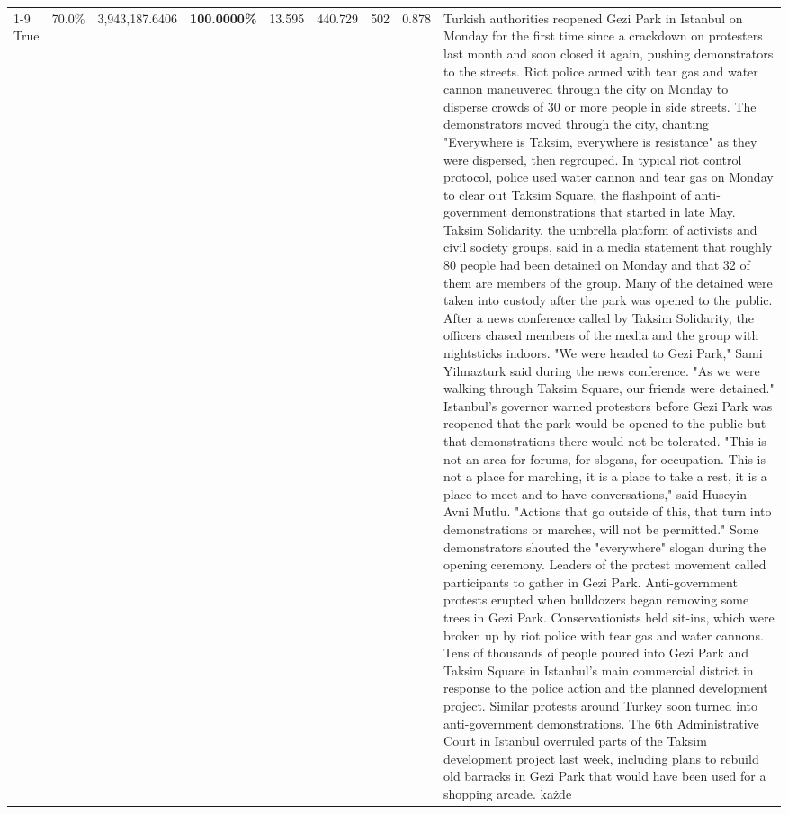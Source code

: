 \begin{table}[H]
\begin{tabular}{lllrlllll}
\cline{1-9}
True & 70.0\% & 3,943,187.6406 & \bfseries \color{red} 100.0000\% & 13.595 & 440.729 & 502 & 0.878 & Turkish authorities reopened Gezi Park in Istanbul on Monday for the first time since a crackdown on protesters last month and soon closed it again, pushing demonstrators to the streets. Riot police armed with tear gas and water cannon maneuvered through the city on Monday to disperse crowds of 30 or more people in side streets. The demonstrators moved through the city, chanting "Everywhere is Taksim, everywhere is resistance" as they were dispersed, then regrouped. In typical riot control protocol, police used water cannon and tear gas on Monday to clear out Taksim Square, the flashpoint of anti-government demonstrations that started in late May. Taksim Solidarity, the umbrella platform of activists and civil society groups, said in a media statement that roughly 80 people had been detained on Monday and that 32 of them are members of the group. Many of the detained were taken into custody after the park was opened to the public. After a news conference called by Taksim Solidarity, the officers chased members of the media and the group with nightsticks indoors. "We were headed to Gezi Park," Sami Yilmazturk said during the news conference. "As we were walking through Taksim Square, our friends were detained." Istanbul's governor warned protestors before Gezi Park was reopened that the park would be opened to the public but that demonstrations there would not be tolerated. "This is not an area for forums, for slogans, for occupation. This is not a place for marching, it is a place to take a rest, it is a place to meet and to have conversations," said Huseyin Avni Mutlu. "Actions that go outside of this, that turn into demonstrations or marches, will not be permitted." Some demonstrators shouted the "everywhere" slogan during the opening ceremony. Leaders of the protest movement called participants to gather in Gezi Park. Anti-government protests erupted when bulldozers began removing some trees in Gezi Park. Conservationists held sit-ins, which were broken up by riot police with tear gas and water cannons. Tens of thousands of people poured into Gezi Park and Taksim Square in Istanbul's main commercial district in response to the police action and the planned development project. Similar protests around Turkey soon turned into anti-government demonstrations. The 6th Administrative Court in Istanbul overruled parts of the Taksim development project last week, including plans to rebuild old barracks in Gezi Park that would have been used for a shopping arcade. każde \\

\end{tabular}
\end{table}
